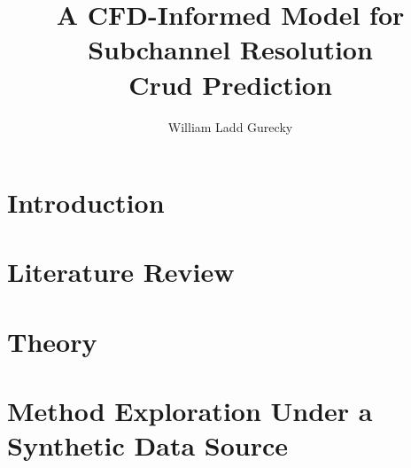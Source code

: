 \documentclass[12pt]{report}
\author{William Ladd Gurecky}
\title{A CFD-Informed Model for Subchannel Resolution \\ Crud Prediction}
\newcommand{\hsp}{\hspace{20pt}}
\begin{document}
\copyrightpage          %
\commcertpage           %
\titlepage              %
	
\renewcommand{\thepage}{\roman{page}}






\pagebreak
\tableofcontents
\pagebreak



\titleformat{\chapter}[hang]{\Huge\bfseries}{\thechapter\hsp\textcolor{gray75}{|}\hsp}{0pt}{\Huge\bfseries}
\renewcommand{\thepage}{\arabic{page}} %
\setcounter{page}{1}
\doublespacing  %
\chapter{Introduction}
\label{chap:intro}


\chapter{Literature Review}
\label{chap:lit}


\chapter{Theory}
\label{chap:theory}


\chapter{Method Exploration Under a Synthetic Data Source}
\label{chap:work}


\end{document}
